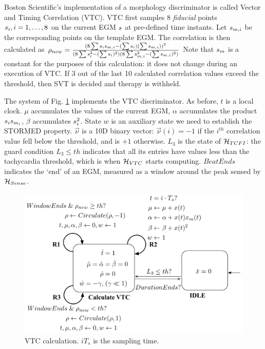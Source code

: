 Boston Scientific's implementation of a morphology discriminator is called Vector and Timing Correlation (VTC).
VTC first samples 8 \emph{fiducial} points $s_i,i=1,\ldots,8$ on the current \ac{EGM} $s$ at pre-defined time instants.
Let $s_{m,i}$ be the corresponding points on the template \ac{EGM}.
The correlation is then calculated as \cite{compass}
$\rho_{new} = \frac{(8\sum s_i s_{m,i} - (\sum s_i)(\sum s_{m,i}))^2}{(8\sum s_i^2 - (\sum s_i)^2)(8\sum s_{m,i}^2 - (\sum s_{m,i})^2)}    $
Note that $s_m$ is a constant for the purposes of this calculation: it does not change during an execution of VTC. 
If 3 out of the last 10 calculated correlation values exceed the threshold, then \ac{SVT} is decided and therapy is withheld.

The system of Fig. \ref{fig:HVTC} implements the VTC discriminator.
As before, $t$ is a local clock.
$\mu$ accumulates the values of the current \ac{EGM}, $\alpha$ accumulates the product $s_i s_{m_i}$, 
$\beta$ accumulates $s_i^2$.
State $w$ is an auxiliary state we need to establish the STORMED property.
$\vec{\nu}$ is a 10D binary vector: $\vec{\nu}(i) = -1$ if the $i^{th}$ correlation value fell below the threshold, and is $+1$ otherwise.
$L_3$ is the state of $\mathcal{H}_{TCFI}$: the guard condition $L_3 \leq th$ indicates that all its entries have values less than the tachycardia threshold, which is when $\mathcal{H}_{VTC}$ starts computing.
$BeatEnds$ indicates the `end' of an \ac{EGM}, measured as a window around the peak sensed by $\mathcal{H}_{Sense}$.  
%
\begin{figure}[t]
\centering
\includegraphics[scale=0.325]{figures/VTC1v2}
\vspace{-10pt}
\caption{VTC calculation. $iT_s$ is the sampling time.}
\vspace{-10pt}
\label{fig:HVTC}
\end{figure}
